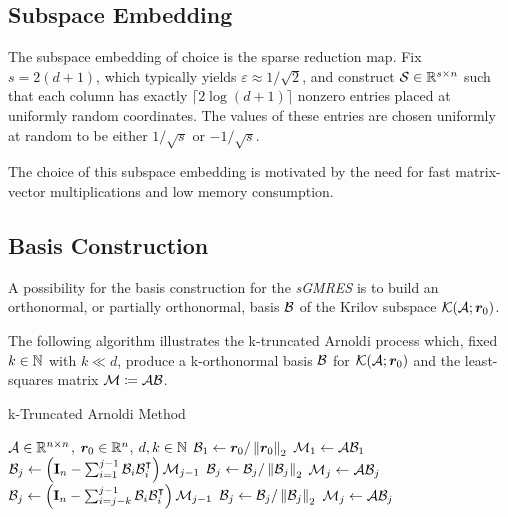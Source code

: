 \subsection{Subspace Embedding} \label{sseq:embdedding}

The subspace embedding of choice is the sparse reduction map. Fix $s = 2 \left( d + 1 \right)$, which typically yields $\varepsilon \approx 1 / \sqrt{2}$, and construct $\mathcal{S} \in \mathbb{R}^{s \times n}$ such that each column has exactly $\lceil 2 \log \left( d + 1 \right) \rceil$ nonzero entries placed at uniformly random coordinates. The values of these entries are chosen uniformly at random to be either $1 / \sqrt{s}$ or $-1 / \sqrt{s}$.

The choice of this subspace embedding is motivated by the need for fast matrix-vector multiplications and low memory consumption.

\subsection{Basis Construction} \label{sseq:basis}

A possibility for the basis construction for the \textit{sGMRES} is to build an orthonormal, or partially orthonormal, basis $\mathcal{B}$ of the Krilov subspace $\mathcal{K}(\mathcal{A}; \bm{r}_0)$.

The following algorithm illustrates the k-truncated Arnoldi process which, fixed $k \in \mathbb{N}$ with $k \ll d$, produce a k-orthonormal basis $\mathcal{B}$ for $\mathcal{K}(\mathcal{A}; \bm{r}_0)$ and the least-squares matrix $\mathcal{M} \coloneqq \mathcal{A} \mathcal{B}$.

\begin{algorithm}
\caption{k-Truncated Arnoldi Method} \label{alg:arnoldi}
\begin{algorithmic}
\Require $\mathcal{A} \in \mathbb{R}^{n \times n}$, $\bm{r}_0 \in \mathbb{R}^{n}$, $d, k \in \mathbb{N}$
\State $\mathcal{B}_1 \gets \bm{r}_0 / \left\lVert \bm{r}_0 \right\rVert_2$
\State $\mathcal{M}_1 \gets \mathcal{A} \mathcal{B}_1$
    \State $\mathcal{B}_j \gets \left( \mathbf{I}_n - \sum_{i=1}^{j-1} \mathcal{B}_i \mathcal{B}_i^{\intercal} \right) \mathcal{M}_{j-1}$
    \State $\mathcal{B}_j \gets \mathcal{B}_j / \left\lVert \mathcal{B}_j \right\rVert_2$
    \State $\mathcal{M}_j \gets \mathcal{A} \mathcal{B}_j$
\EndFor
{}
    \State $\mathcal{B}_j \gets \left( \mathbf{I}_n - \sum_{i=j-k}^{j-1} \mathcal{B}_i \mathcal{B}_i^{\intercal} \right) \mathcal{M}_{j-1}$
    \State $\mathcal{B}_j \gets \mathcal{B}_j / \left\lVert \mathcal{B}_j \right\rVert_2$
    \State $\mathcal{M}_j \gets \mathcal{A} \mathcal{B}_j$
\EndFor
\end{algorithmic}
\end{algorithm}

